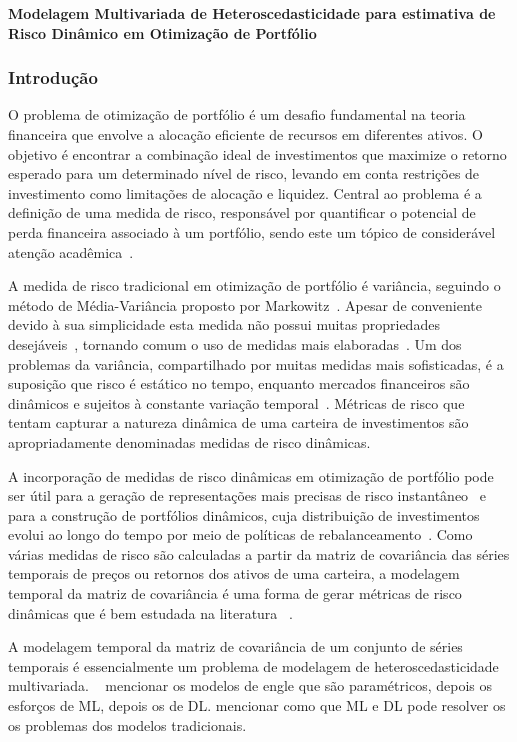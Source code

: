 \documentclass[a4paper, 12pt]{article}
\begin{document}
\textbf{Modelagem Multivariada de Heteroscedasticidade para estimativa de Risco
Dinâmico em Otimização de Portfólio}

\subsubsection*{Introdução}

O problema de otimização de portfólio é um desafio fundamental na teoria
financeira que envolve a alocação eficiente de recursos em diferentes ativos. O
objetivo é encontrar a combinação ideal de investimentos que maximize o retorno
esperado para um determinado nível de risco, levando em conta restrições de
investimento como limitações de alocação e liquidez. Central ao problema é a
definição de uma medida de risco, responsável por quantificar o potencial de
perda financeira associado à um portfólio, sendo este um tópico de considerável
atenção acadêmica~\cite{best_risk_measure, righi2018, hoe2010, ramos2023}.

A medida de risco tradicional em otimização de portfólio é variância, seguindo
o método de Média-Variância proposto por Markowitz~\cite{markowitz}. Apesar de
conveniente devido à sua simplicidade esta medida não possui muitas
propriedades desejáveis~\cite{rockafellar2002deviation}, tornando comum o uso
de medidas mais elaboradas~\cite{gambrah2014risk, sereda, adam2008spectral}. Um
dos problemas da variância, compartilhado por muitas medidas mais sofisticadas,
é a suposição que risco é estático no tempo, enquanto mercados financeiros são
dinâmicos e sujeitos à constante variação temporal~\cite{procacci}. Métricas de
risco que tentam capturar a natureza dinâmica de uma carteira de investimentos
são apropriadamente denominadas medidas de risco dinâmicas.

A incorporação de medidas de risco dinâmicas em otimização de portfólio pode
ser útil para a geração de representações mais precisas de risco
instantâneo~\cite{weirum} e para a construção de portfólios dinâmicos, cuja
distribuição de investimentos evolui ao longo do tempo por meio de políticas de
rebalanceamento~\cite{metin, holten}. Como várias medidas de risco são
calculadas a partir da matriz de covariância das séries temporais de preços ou
retornos dos ativos de uma carteira, a modelagem temporal da matriz de
covariância é uma forma de gerar métricas de risco dinâmicas que é bem
estudada na literatura ~\cite{zakamulin2015test, chan1999portfolio}.

A modelagem temporal da matriz de covariância de um conjunto de séries
temporais é essencialmente um problema de modelagem de heteroscedasticidade
multivariada. ~ mencionar os modelos de engle que são paramétricos, depois os
esforços de ML, depois os de DL. mencionar como que ML e DL pode resolver os
os problemas dos modelos tradicionais.
\end{document}
